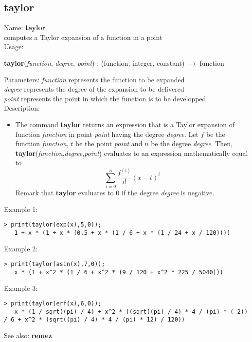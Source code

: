 \subsection{ taylor }
\noindent Name: \textbf{taylor}\\
computes a Taylor expansion of a function in a point\\

\noindent Usage: 
\begin{center}
\textbf{taylor}(\emph{function}, \emph{degree}, \emph{point}) : (\textsf{function}, \textsf{integer}, \textsf{constant}) $\rightarrow$ \textsf{function}\\
\end{center}
Parameters: 
\emph{function} represents the function to be expanded\\
\emph{degree} represents the degree of the expansion to be delivered\\
\emph{point} represents the point in which the function is to be developped\\

\noindent Description: \begin{itemize}

\item The command \textbf{taylor} returns an expression that is a Taylor expansion
   of function \emph{function} in point \emph{point} having the degree \emph{degree}.
   Let $f$ be the function \emph{function}, $t$ be the point \emph{point} and
   $n$ be the degree \emph{degree}. Then, \textbf{taylor}(\emph{function},\emph{degree},\emph{point}) 
   evaluates to an expression mathematically equal to 
   $$\sum\limits_{i=0}^n \frac{f^{(i)}}{i!} \left(x - t \right)^i$$
   Remark that \textbf{taylor} evaluates to $0$ if the degree \emph{degree} is negative.
\end{itemize}
\noindent Example 1: 
\begin{center}\begin{minipage}{14.8cm}\begin{Verbatim}[frame=single]
   > print(taylor(exp(x),5,0));
   1 + x * (1 + x * (0.5 + x * (1 / 6 + x * (1 / 24 + x / 120))))
\end{Verbatim}
\end{minipage}\end{center}
\noindent Example 2: 
\begin{center}\begin{minipage}{14.8cm}\begin{Verbatim}[frame=single]
   > print(taylor(asin(x),7,0));
   x * (1 + x^2 * (1 / 6 + x^2 * (9 / 120 + x^2 * 225 / 5040)))
\end{Verbatim}
\end{minipage}\end{center}
\noindent Example 3: 
\begin{center}\begin{minipage}{14.8cm}\begin{Verbatim}[frame=single]
   > print(taylor(erf(x),6,0));
   x * (1 / sqrt((pi) / 4) + x^2 * ((sqrt((pi) / 4) * 4 / (pi) * (-2)) / 6 + x^2 * (sqrt((pi) / 4) * 4 / (pi) * 12) / 120))
\end{Verbatim}
\end{minipage}\end{center}
See also: \textbf{remez}
